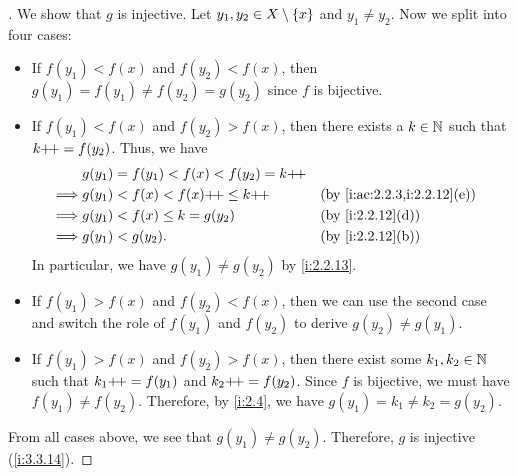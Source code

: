 \begin{proof}[]
  We show that \(g\) is injective.
  Let \(y_1, y_2 \in X \setminus \left\lbrace x\right\rbrace\) and \(y_1 \neq y_2\).
  Now we split into four cases:
  \begin{itemize}
    \item If \(f(y_1) < f(x)\) and \(f(y_2) < f(x)\), then \(g(y_1) = f(y_1) \neq f(y_2) = g(y_2)\) since \(f\) is bijective.
    \item If \(f(y_1) < f(x)\) and \(f(y_2) > f(x)\), then there exists a \(k \in \mathbb{N}\) such that \(k{+}\!{+} = f(y_2)\).
          Thus, we have
          \begin{align*}
                     & g(y_1) = f(y_1) < f(x) < f(y_2) = k\pp                                  \\
            \implies & g(y_1) < f(x) < f(x)\pp \leq k\pp      &  & \by{i:ac:2.2.3,i:2.2.12}[e] \\
            \implies & g(y_1) < f(x) \leq k = g(y_2)          &  & \by{i:2.2.12}[d]            \\
            \implies & g(y_1) < g(y_2).                       &  & \by{i:2.2.12}[b]
          \end{align*}
          In particular, we have \(g(y_1) \neq g(y_2)\) by \cref{i:2.2.13}.
    \item If \(f(y_1) > f(x)\) and \(f(y_2) < f(x)\), then we can use the second case and switch the role of \(f(y_1)\) and \(f(y_2)\) to derive \(g(y_2) \neq g(y_1)\).
    \item If \(f(y_1) > f(x)\) and \(f(y_2) > f(x)\), then there exist some \(k_1, k_2 \in \mathbb{N}\) such that \(k_1{+}\!{+} = f(y_1)\) and \(k_2{+}\!{+} = f(y_2)\).
          Since \(f\) is bijective, we must have \(f(y_1) \neq f(y_2)\).
          Therefore, by \cref{i:2.4}, we have \(g(y_1) = k_1 \neq k_2 = g(y_2)\).
  \end{itemize}
  From all cases above, we see that \(g(y_1) \neq g(y_2)\).
  Therefore, \(g\) is injective (\cref{i:3.3.14}).


\end{proof}
